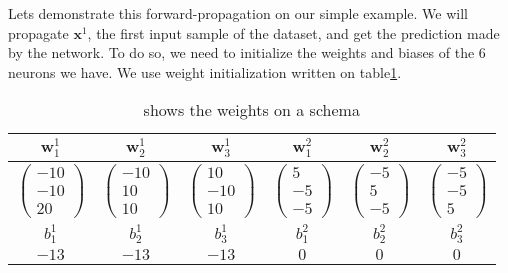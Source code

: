 		\vskip 1cm
		Lets demonstrate this forward-propagation on our simple example. We will propagate $\boldsymbol{x}^1$, the first input sample of the dataset, and get the prediction made by the network. To do so, we need to initialize the weights and biases of the 6 neurons we have. We use weight initialization written on table\ref{tab:NN_weights}.

		\begin{table}[h]
			\centering
			\begin{tabular}{c|c|c||c|c|c}
				$\boldsymbol{w}^1_1$ & $\boldsymbol{w}^1_2$ & $\boldsymbol{w}^1_3$ & $\boldsymbol{w}^2_1$ & $\boldsymbol{w}^2_2$ & $\boldsymbol{w}^2_3$ \\
				\hline
					$ \left( \begin{matrix} -10  \\ -10  \\  20 \end{matrix}\right) $ &
					$ \left( \begin{matrix} -10  \\  10  \\  10 \end{matrix}\right) $ &
					$ \left( \begin{matrix}  10  \\ -10  \\  10 \end{matrix}\right) $ &
					$ \left( \begin{matrix}  5   \\ -5   \\ -5  \end{matrix}\right) $ &
					$ \left( \begin{matrix} -5   \\  5   \\ -5  \end{matrix}\right) $ &
					$ \left( \begin{matrix} -5   \\ -5   \\  5  \end{matrix}\right) $ \\
				\hline
				\hline
				$b^1_1$ & $b^1_2$ & $b^1_3$ & $b^2_1$ & $b^2_2$ & $b^2_3$ \\
				$-13$   & $-13$   & $-13$   & $0$     & $0$     & $0$     \\
			\end{tabular}
			\caption{  shows the weights on a schema}
			\label{tab:NN_weights}
		\end{table}

